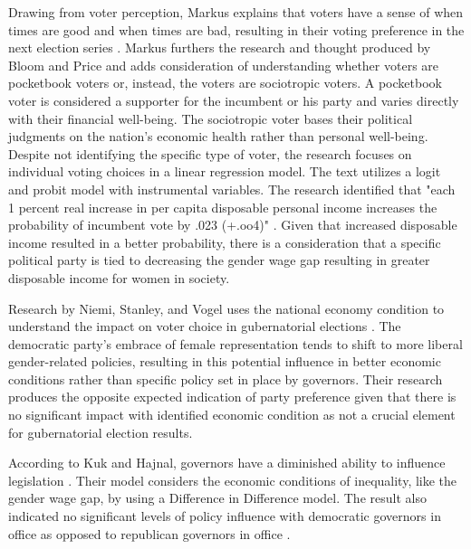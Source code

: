 \documentclass[12pt, English]{article}
\begin{document}
Drawing from voter perception, Markus explains that voters have a sense of when times are good and when times are bad, resulting in their voting preference in the next election series \citep{markus1988impact}. Markus furthers the research and thought produced by Bloom and Price and adds consideration of understanding whether voters are pocketbook voters or, instead, the voters are sociotropic voters. A pocketbook voter is considered a supporter for the incumbent or his party and varies directly with their financial well-being. The sociotropic voter bases their political judgments on the nation's economic health rather than personal well-being. Despite not identifying the specific type of voter, the research focuses on individual voting choices in a linear regression model. The text utilizes a logit and probit model with instrumental variables. The research identified that "each 1 percent real increase in per capita disposable personal income increases the probability of incumbent vote by .023 (+.oo4)" \citep{markus1988impact}. Given that increased disposable income resulted in a better probability, there is a consideration that a specific political party is tied to decreasing the gender wage gap resulting in greater disposable income for women in society. 

Research by Niemi, Stanley, and Vogel uses the national economy condition to understand the impact on voter choice in gubernatorial elections \citep{niemi1995state}. The democratic party's embrace of female representation tends to shift to more liberal gender-related policies, resulting in this potential influence in better economic conditions rather than specific policy set in place by governors. Their research produces the opposite expected indication of party preference given that there is no significant impact with identified economic condition as not a crucial element for gubernatorial election results. 

According to Kuk and Hajnal, governors have a diminished ability to influence legislation \citep{kuk2021democratic}. Their model considers the economic conditions of inequality, like the gender wage gap, by using a Difference in Difference model. The result also indicated no significant levels of policy influence with democratic governors in office as opposed to republican governors in office \citep{kuk2021democratic}. 
\end{document}
